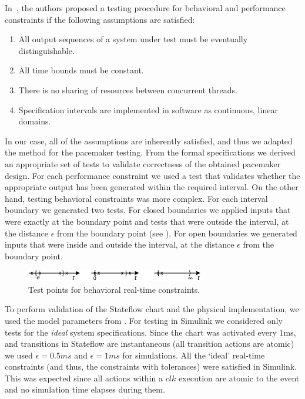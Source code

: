 In~\cite{ClarkeLee}, the authors proposed a testing procedure for behavioral and performance constraints if the following assumptions are satisfied:

\begin{enumerate}
\item All output sequences of a system under test must be eventually distinguishable.
\item All time bounds must be constant.
\item There is no sharing of resources between concurrent threads.
\item Specification intervals are implemented in software as continuous, linear domains.
\end{enumerate}

In our case, all of the assumptions are inherently satisfied,  and thus we adapted the method for the pacemaker testing. From the formal specifications we derived an appropriate set of tests to validate correctness of the obtained pacemaker design. For each performance constraint we used a test that validates whether the appropriate output has been generated within the required interval. On the other hand, testing behavioral constraints was more complex. For each interval boundary we generated two tests. For closed boundaries we applied inputs that were exactly at the boundary point and tests that were outside the interval, at the distance $\epsilon$ from the boundary point (see ). For open boundaries we generated inputs that were inside and outside the interval, at the distance $\epsilon$ from the boundary point.


\begin{figure} [!t]
\center
		\includegraphics[width=0.69\textwidth]{figs/test_vects.png}
\caption{Test points for behavioral real-time constraints.}
\label{fig:b_tests}
\end{figure}


To perform validation of the Stateflow chart and the physical implementation, we used the model parameters from . For testing in Simulink we considered only tests for the \textit{ideal} system specifications. Since the chart was activated every 1ms, and transitions in Stateflow are instantaneous (all transition actions are atomic) we used $\epsilon = 0.5 ms$ and $\epsilon = 1 ms$ for simulations. All the `ideal' real-time constraints (and thus, the constraints with tolerances) were satisfied in Simulink. This was expected since all actions within a $clk$ execution are atomic to the event and no simulation time elapses during them. 

